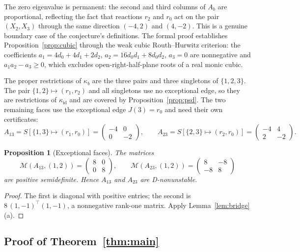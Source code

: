 \documentclass[11pt,a4paper]{article}
\newtheorem{proposition}[theorem]{Proposition}
\theoremstyle{definition}
\theoremstyle{remark}
\newcommand{\Sym}{\mathcal{M}}
\begin{document}
The zero eigenvalue is permanent: the second and third columns of $A_b$ are proportional, reflecting the fact that reactions $r_2$ and $r_0$ act on the pair $(X_2,X_3)$ through the same direction $(-4,2)$ and $(4,-2)$. This is a genuine boundary case of the conjecture's definitions. The formal proof establishes Proposition~\ref{prop:cubic} through the weak cubic Routh--Hurwitz criterion: the coefficients $a_1=4d_0+4d_1+2d_2$, $a_2=16d_0d_1+8d_0d_2$, $a_3=0$ are nonnegative and $a_1a_2-a_3\ge0$, which excludes open-right-half-plane roots of a real monic cubic.

The proper restrictions of $\kappa_b$ are the three pairs and three singletons of $\{1,2,3\}$. The pair $\{1,2\}\mapsto(r_1,r_2)$ and all singletons use no exceptional edge, so they are restrictions of $\kappa_{\mathrm{id}}$ and are covered by Proposition~\ref{prop:psd}. The two remaining faces use the exceptional edge $J(3)=r_0$ and need their own certificates:
\begin{equation}\label{eq:faces}
A_{13}=S[\{1,3\}\mapsto(r_1,r_0)]=\begin{pmatrix}-4&0\\0&-2\end{pmatrix},\qquad
A_{23}=S[\{2,3\}\mapsto(r_2,r_0)]=\begin{pmatrix}-4&4\\2&-2\end{pmatrix}.
\end{equation}

\begin{proposition}[Exceptional faces]\label{prop:faces}
The matrices
\[
\Sym(A_{13},(1,2))=\begin{pmatrix}8&0\\0&8\end{pmatrix},\qquad
\Sym(A_{23},(1,2))=\begin{pmatrix}8&-8\\-8&8\end{pmatrix}
\]
are positive semidefinite. Hence $A_{13}$ and $A_{23}$ are D-nonunstable.
\end{proposition}

\begin{proof}
The first is diagonal with positive entries; the second is $8\,(1,-1)^{\top}(1,-1)$, a nonnegative rank-one matrix. Apply Lemma~\ref{lem:bridge}(a).
\end{proof}

\subsection{Proof of Theorem~\ref{thm:main}}
\end{document}
